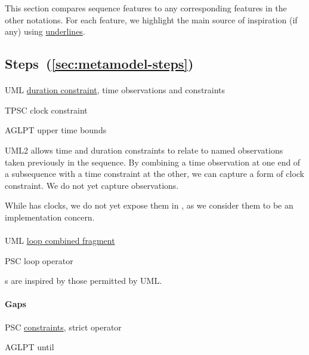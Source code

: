 \newcommand{\insp}[1]{\ul{#1}}

This section compares \langname{} sequence features to any
corresponding features in the other notations.
For each feature, we highlight the main source of inspiration (if any)
using \insp{underlines}.


\subsection{Steps~(\ref{sec:metamodel-steps})}

\paragraph{\mdeadlinestep}
\begin{featset}
\item[UML] \insp{duration constraint}, time observations and constraints
\item[TPSC] clock constraint
\item[AGLPT] upper time bounds
\end{featset}

UML2 allows time and duration constraints to relate to named observations taken
previously in the sequence.  By combining a time observation at one end of a
subsequence with a time constraint at the other, we can capture a form of clock
constraint.  We do not yet capture observations.

While \robochart{} has clocks, we do not yet expose them in
\langname, as we consider them to be an implementation concern.
      
\paragraph{\mloopstep}
\begin{featset}
\item[UML] \insp{loop combined fragment}
\item[PSC] loop operator
\end{featset}

\mloopbound s are inspired by those permitted by UML.

\paragraph{Gaps}
\begin{featset}
\item[PSC] \insp{constraints}, strict operator
\item[AGLPT] until
\end{featset}

